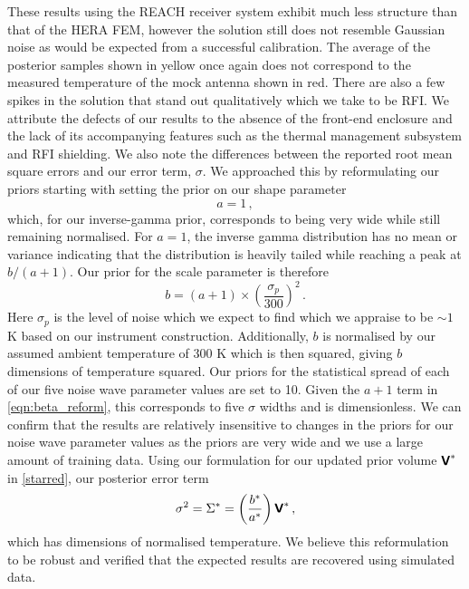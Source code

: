 These results using the REACH receiver system exhibit much less structure than that of the HERA FEM, however the solution still does not resemble Gaussian noise as would be expected from a successful calibration. The average of the posterior samples shown in yellow once again does not correspond to the measured temperature of the mock antenna shown in red. There are also a few spikes in the solution that stand out qualitatively which we take to be RFI. We attribute the defects of our results to the absence of the front-end enclosure and the lack of its accompanying features such as the thermal management subsystem and RFI shielding. We also note the differences between the reported root mean square errors and our error term, $\sigma$. We approached this by reformulating our priors starting with setting the prior on our shape parameter
\begin{equation}
    a = 1 \,,
    \label{eqn:alpha_reform}
\end{equation}
which, for our inverse-gamma prior, corresponds to being very wide while still remaining normalised. For $a=1$, the inverse gamma distribution has no mean or variance \citep{inverse_gamma} indicating that the distribution is heavily tailed while reaching a peak at $b/(a + 1)$. Our prior for the scale parameter is therefore 
\begin{equation}
    b = \left(a + 1\right) \times \left(\frac{\sigma_{p}}{300}\right)^2 \,.
    \label{eqn:beta_reform}
\end{equation}
Here $\sigma_{p}$ is the level of noise which we expect to find which we appraise to be $\sim 1$ K based on our instrument construction. Additionally, $b$ is normalised by our assumed ambient temperature of 300 K which is then squared, giving $b$ dimensions of temperature squared. Our priors for the statistical spread of each of our five noise wave parameter values are set to 10. Given the $a + 1$ term in \cref{eqn:beta_reform}, this corresponds to five $\sigma$ widths and is dimensionless. We can confirm that the results are relatively insensitive to changes in the priors for our noise wave parameter values as the priors are very wide and we use a large amount of training data. Using our formulation for our updated prior volume $\textbf{\textsf{V}}^*$ in \cref{starred}, our posterior error term
\begin{equation}
    \sigma^2 = \Sigma^* = \left( \frac{b^*}{a^*} \right) \textbf{\textsf{V}}^* \,,
    \label{eqn:sigma_reform}
\end{equation}
which has dimensions of normalised temperature. We believe this reformulation to be robust and verified that the expected results are recovered using simulated data.

